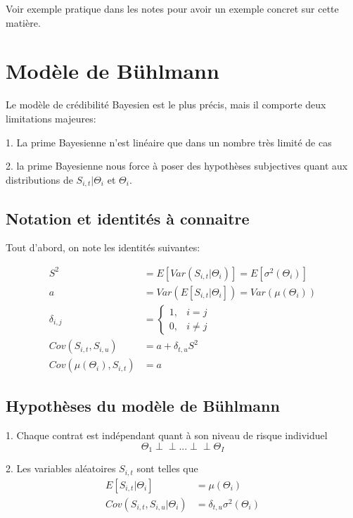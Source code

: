 Voir exemple pratique dans les notes pour avoir un exemple concret sur cette matière.

\section{Modèle de Bühlmann } 

Le modèle de crédibilité Bayesien est le plus précis, mais il comporte deux limitations majeures:

1. La prime Bayesienne n'est linéaire que dans un nombre très limité de cas

2. la prime Bayesienne nous force à poser des hypothèses subjectives quant aux distributions de $S_{i,t}|\Theta_i$ et $\Theta_i$.

\subsection{ Notation et identités à connaitre}

Tout d'abord, on note les identités suivantes:

$$\boxed{\begin{aligned} 
S^2 &= E[Var(S_{i,t}|\Theta_i)] = E[\sigma^2(\Theta_i)] \\
a &= Var(E[S_{i,t}|\Theta_i]) = Var(\mu(\Theta_i)) \\
    \delta_{i,j}&= 
\begin{cases}
    1,    & i=j\\
    0,    & i\neq j
\end{cases}
 \\
Cov(S_{i,t},S_{i,u})  &=a + \delta_{t,u}S^2 \\
Cov(\mu(\Theta_i),S_{i,t}) &=a 
\end{aligned}}$$

\subsection{ Hypothèses du modèle de Bühlmann}

1. Chaque contrat est indépendant quant à son niveau de risque individuel
$$\Theta_1 {\perp\!\!\!\perp} ... {\perp\!\!\!\perp} \Theta_I$$

2. Les variables aléatoires $S_{i,t}$ sont telles que
$$\begin{aligned}
E[S_{i,t}|\Theta_i] &= \mu(\Theta_i) \\
Cov(S_{i,t},S_{i,u}|\Theta_i) &= \delta_{t,u} \sigma^2(\Theta_i)
\end{aligned}$$
 
